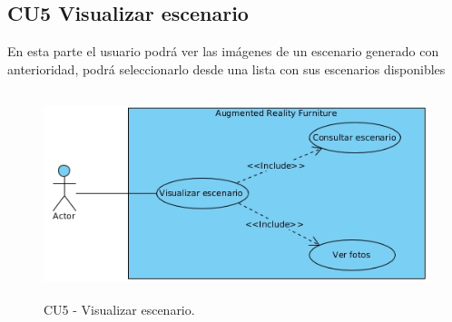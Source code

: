 \newpage
\subsection{CU5 Visualizar escenario}\par
En esta parte el usuario podrá ver las imágenes de un escenario generado con anterioridad, podrá seleccionarlo desde una lista con sus escenarios disponibles
\begin{figure}[h!]
	\centering
	\includegraphics[width=12cm,height=6cm]{imagenes/analisis/visualizarEscenario.jpg}
	\caption{CU5 - Visualizar escenario.}
	\label{fig:analogo}
\end{figure}